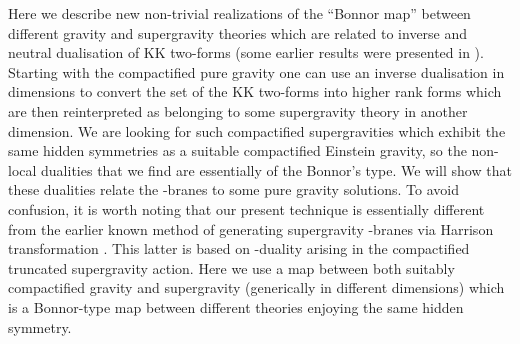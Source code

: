 \documentclass[a4paper,12pt]{article}
\begin{document}
Here we describe new non-trivial realizations of the ``Bonnor
map'' between different gravity and supergravity theories which
are related to inverse and neutral dualisation of KK two-forms
(some earlier results were presented in
\cite{ChGaMaSh99,ChGaSh00}). Starting with the compactified
pure gravity one can use an inverse dualisation in dimensions
\coordHE{} to convert the set of the KK two-forms into higher
rank forms which are then reinterpreted as belonging to some
supergravity theory in another dimension. We are looking for
such compactified supergravities which exhibit the same hidden
symmetries as a suitable compactified Einstein gravity, so the
non-local dualities that we find are essentially of the
Bonnor's type. We will show that these dualities relate the
\coordHE{}-branes \cite{St97} to some pure gravity solutions. To avoid
confusion, it is worth noting that our present technique is
essentially different from the earlier known method of
generating supergravity \coordHE{}-branes via Harrison transformation
\cite{GaRy98}. This latter is based on \coordHE{}-duality arising in
the compactified truncated supergravity action. Here we use a
map between both suitably compactified gravity and supergravity
(generically in different dimensions) which is a Bonnor-type
map between different theories enjoying the same hidden
symmetry.
\end{document}
